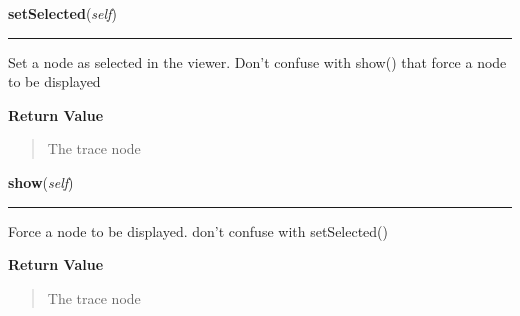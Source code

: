 \hspace{.8\funcindent}\begin{boxedminipage}{\funcwidth}

    \raggedright \textbf{setSelected}(\textit{self})

    \vspace{-1.5ex}

    \rule{\textwidth}{0.5\fboxrule}
\setlength{\parskip}{2ex}
    Set a node as selected in the viewer. Don't confuse with show() that 
    force a node to be displayed

\setlength{\parskip}{1ex}
      \textbf{Return Value}
    \vspace{-1ex}

      \begin{quote}
      The trace node

      \end{quote}

    \end{boxedminipage}

    \label{tracetool:TraceNode:show}

    \vspace{0.5ex}

\hspace{.8\funcindent}\begin{boxedminipage}{\funcwidth}

    \raggedright \textbf{show}(\textit{self})

    \vspace{-1.5ex}

    \rule{\textwidth}{0.5\fboxrule}
\setlength{\parskip}{2ex}
    Force a node to be displayed. don't confuse with setSelected()

\setlength{\parskip}{1ex}
      \textbf{Return Value}
    \vspace{-1ex}

      \begin{quote}
      The trace node

      \end{quote}

    \end{boxedminipage}

    \label{tracetool:TraceNode:delete}

    \vspace{0.5ex}

